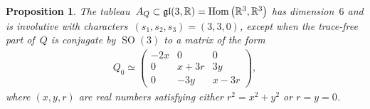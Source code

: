 \documentclass[11pt]{article}
\numberwithin{equation}{section}
\newtheorem{Proposition}[Theorem]{Proposition}
 { \theoremstyle{definition}
\newtheorem{Example}[Theorem]{Example}
\newtheorem{Remark}[Theorem]{Remark} }
\newcommand{\bbR}{{\mathbb R}}
\newcommand{\SO}{\operatorname{SO}}
\newcommand{\eugl}{\operatorname{\frak{gl}}}
\DeclareMathOperator{\Hom}{Hom}
\begin{document}
\begin{Proposition}\label{prop: nondegenerateA_Q}
The tableau~$A_Q\subset \eugl(3,\bbR) = \Hom \big(\bbR^3,\bbR^3\big)$
has dimension~$6$ and is involutive
with characters~$(s_1,s_2,s_3) = (3,3,0)$,
except when the trace-free part of~$Q$ is conjugate by $\SO(3)$
to a matrix of the form
\begin{gather}\label{eq: Q0normalizeddegenerate}
Q_0 \simeq \begin{pmatrix}-2x&0&0\\0&x+3r&3y\\0&-3y&x-3r\end{pmatrix},
\end{gather}
where $(x,y,r)$ are real numbers satisfying either $r^2 = x^2 + y^2$
or $r = y = 0$.
\end{Proposition}
\end{document}
